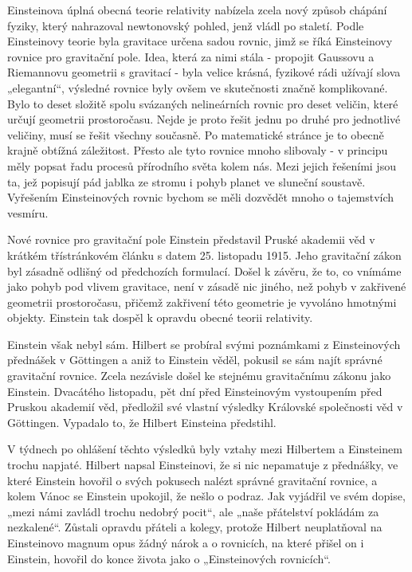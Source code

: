   Einsteinova úplná obecná teorie relativity nabízela zcela nový způsob chápání fyziky, který
  nahrazoval newtonovský pohled, jenž vládl po staletí. Podle Einsteinovy teorie byla gravitace
  určena sadou rovnic, jimž se říká Einsteinovy rovnice pro gravitační pole. Idea, která za nimi
  stála - propojit Gaussovu a Riemannovu geometrii s gravitací - byla velice krásná, fyzikové rádi
  užívají slova „elegantní“, výsledné rovnice byly ovšem ve skutečnosti značně komplikované. Bylo to
  deset složitě spolu svázaných nelineárních rovnic pro deset veličin, které určují geometrii
  prostoročasu. Nejde je proto řešit jednu po druhé pro jednotlivé veličiny, musí se řešit všechny
  současně. Po matematické stránce je to obecně krajně obtížná záležitost. Přesto ale tyto rovnice
  mnoho slibovaly - v principu měly popsat řadu procesů přírodního světa kolem nás. Mezi jejich
  řešeními jsou ta, jež popisují pád jablka ze stromu i pohyb planet ve sluneční soustavě. Vyřešením
  Einsteinových rovnic bychom se měli dozvědět mnoho o tajemstvích vesmíru. 
  
  Nové rovnice pro gravitační pole Einstein představil Pruské akademii věd v krátkém třístránkovém
  článku s datem 25. listopadu 1915. Jeho gravitační zákon byl zásadně odlišný od předchozích
  formulací. Došel k závěru, že to, co vnímáme jako pohyb pod vlivem gravitace, není v zásadě nic
  jiného, než pohyb v zakřivené geometrii prostoročasu, přičemž zakřivení této geometrie je vyvoláno
  hmotnými objekty. Einstein tak dospěl k opravdu obecné teorii relativity. 
  
  Einstein však nebyl sám. Hilbert se probíral svými poznámkami z Einsteinových přednášek v
  Göttingen a aniž to Einstein věděl, pokusil se sám najít správné gravitační rovnice. Zcela
  nezávisle došel ke stejnému gravitačnímu zákonu jako Einstein. Dvacátého listopadu, pět dní před
  Einsteinovým vystoupením před Pruskou akademií věd, předložil své vlastní výsledky Královské
  společnosti věd v Göttingen. Vypadalo to, že Hilbert Einsteina předstihl. 
  
  V týdnech po ohlášení těchto výsledků byly vztahy mezi Hilbertem a Einsteinem trochu napjaté.
  Hilbert napsal Einsteinovi, že si nic nepamatuje z přednášky, ve které Einstein hovořil o svých
  pokusech nalézt správné gravitační rovnice, a kolem Vánoc se Einstein upokojil, že nešlo o podraz.
  Jak vyjádřil ve svém dopise, „mezi námi zavládl trochu nedobrý pocit“, ale „naše přátelství
  pokládám za nezkalené“. Zůstali opravdu přáteli a kolegy, protože Hilbert neuplatňoval na
  Einsteinovo magnum opus žádný nárok a o rovnicích, na které přišel on i Einstein, hovořil do konce
  života jako o „Einsteinových rovnicích“. 
  
